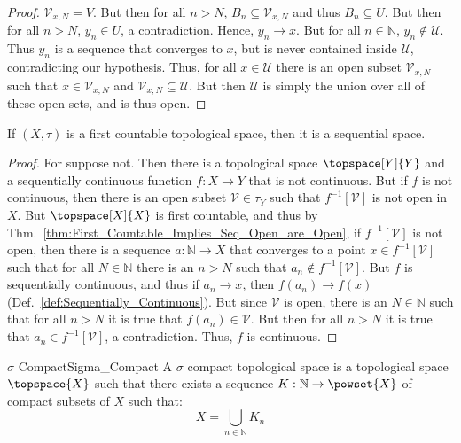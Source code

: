 \documentclass{article}                                                        %
\begin{document}
\begin{proof}
            $\mathcal{V}_{x,N}=V$. But then for all $n>N$,
            $B_{n}\subseteq\mathcal{V}_{x,N}$ and thus $B_{n}\subseteq{U}$.
            But then for all $n>N$, $y_{n}\in{U}$, a contradiction. Hence,
            $y_{n}\rightarrow{x}$. But for all $n\in\mathbb{N}$,
            $y_{n}\notin\mathcal{U}$. Thus $y_{n}$ is a sequence that converges
            to $x$, but is never contained inside $\mathcal{U}$, contradicting
            our hypothesis. Thus, for all $x\in\mathcal{U}$ there is an open
            subset $\mathcal{V}_{x,N}$ such that $x\in\mathcal{V}_{x,N}$ and
            $\mathcal{V}_{x,N}\subseteq\mathcal{U}$. But then $\mathcal{U}$ is
            simply the union over all of these open sets, and is thus open.
        \end{proof}
        \begin{theorem}
            If $(X,\tau)$ is a first countable topological space, then it is
            a sequential space.
        \end{theorem}
        \begin{proof}
            For suppose not. Then there is a topological space $\topspace[Y]{Y}$
            and a sequentially continuous function $f:X\rightarrow{Y}$ that is
            not continuous. But if $f$ is not continuous, then there is an open
            subset $\mathcal{V}\in\tau_{Y}$ such that
            $f^{\minus{1}}[\mathcal{V}]$ is not open in $X$. But
            $\topspace[X]{X}$ is first countable, and thus by
            Thm.~\ref{thm:First_Countable_Implies_Seq_Open_are_Open}, if
            $f^{\minus{1}}[\mathcal{V}]$ is not open, then there is a sequence
            $a:\mathbb{N}\rightarrow{X}$ that converges to a point
            $x\in{f}^{\minus{1}}[\mathcal{V}]$ such that for all
            $N\in\mathbb{N}$ there is an $n>N$ such that
            $a_{n}\notin{f}^{\minus{1}}[\mathcal{V}]$. But $f$ is sequentially
            continuous, and thus if $a_{n}\rightarrow{x}$, then
            $f(a_{n})\rightarrow{f}(x)$
            (Def.~\ref{def:Sequentially_Continuous}). But since $\mathcal{V}$ is
            open, there is an $N\in\mathbb{N}$ such that for all $n>N$ it is
            true that $f(a_{n})\in\mathcal{V}$. But then for all $n>N$ it is
            true that $a_{n}\in{f}^{\minus{1}}[\mathcal{V}]$, a contradiction.
            Thus, $f$ is continuous.
        \end{proof}
        \begin{fdefinition}{$\sigma$ Compact}{Sigma_Compact}
            A $\sigma$ compact topological space is a topological space
            $\topspace{X}$ such that there exists a sequence
            $K:\mathbb{N}\rightarrow\powset{X}$ of compact subsets of $X$ such
            that:
            \begin{equation*}
                X=\bigcup_{n\in\mathbb{N}}K_{n}
            \end{equation*}
        \end{fdefinition}
\end{document}
